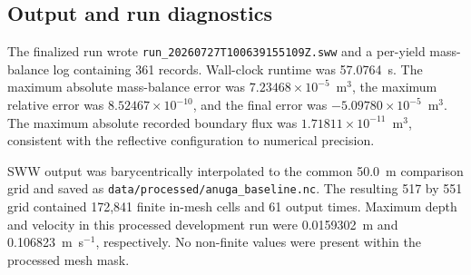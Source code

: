 \subsection{Output and run diagnostics}

The finalized run wrote
\texttt{run\_20260727T100639155109Z.sww} and a per-yield mass-balance log
containing 361 records.  Wall-clock runtime was 57.0764~s.  The maximum
absolute mass-balance error was
\(7.23468\times10^{-5}\)~m\(^3\), the maximum relative error was
\(8.52467\times10^{-10}\), and the final error was
\(-5.09780\times10^{-5}\)~m\(^3\).  The maximum absolute recorded boundary
flux was \(1.71811\times10^{-11}\)~m\(^3\), consistent with the reflective
configuration to numerical precision.

SWW output was barycentrically interpolated to the common 50.0~m comparison
grid and saved as \texttt{data/processed/anuga\_baseline.nc}.  The resulting
517 by 551 grid contained 172,841 finite in-mesh cells and 61 output times.
Maximum depth and velocity in this processed development run were
0.0159302~m and 0.106823~m~s\(^{-1}\), respectively.  No non-finite values
were present within the processed mesh mask.
